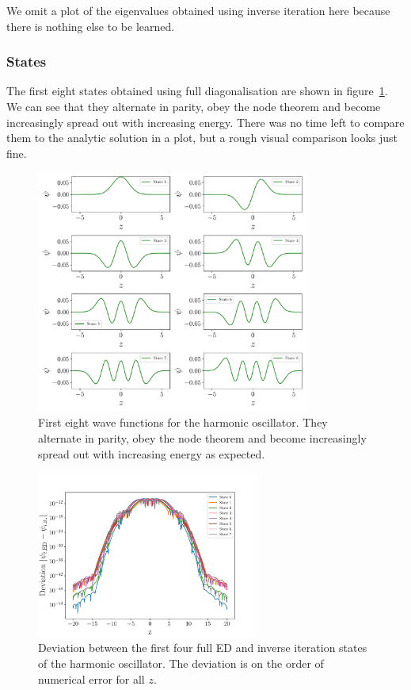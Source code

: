 \documentclass[a4paper,DIV=12,english]{scrartcl}
\begin{document}
We omit a plot of the eigenvalues obtained using inverse iteration here because there is nothing else to be learned.

\subsubsection{States}
The first eight states obtained using full diagonalisation are shown in figure~\ref{fig:states}. We can see that they alternate in parity, obey the node theorem and become increasingly spread out with increasing energy. There was no time left to compare them to the analytic solution in a plot, but a rough visual comparison looks just fine.
\begin{figure}
    \centering
    \includegraphics[width=0.8\textwidth]{../plots/states/states.pdf}
    \caption{First eight wave functions for the harmonic oscillator. They alternate in parity, obey the node theorem and become increasingly spread out with increasing energy as expected.}
    \label{fig:states}
\end{figure}
\begin{figure}
    \centering
    \includegraphics[width=0.65\textwidth]{../plots/states/deviation.pdf}
    \caption{Deviation between the first four full ED and inverse iteration states of the harmonic oscillator. The deviation is on the order of numerical error for all $z$.}
    \label{fig:states_invit}
\end{figure}
\end{document}
